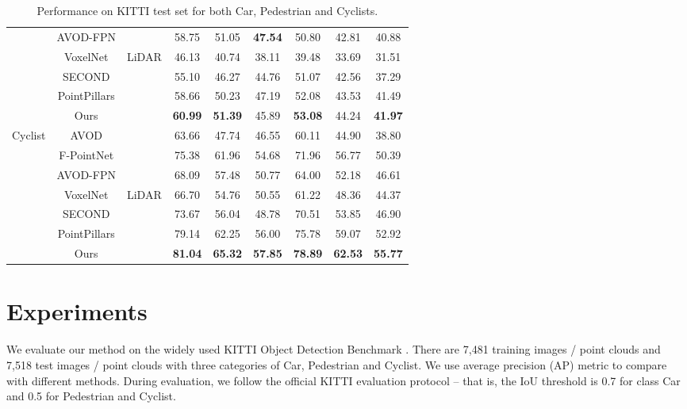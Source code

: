 \documentclass[10pt,twocolumn,letterpaper]{article}
\begin{document}
\begin{table*}[t]
\begin{tabular}{|c|c|c||c|c|c||c|c|c|}
      {} & AVOD-FPN \cite{AVOD} & {} & 58.75 & 51.05 & \bf 47.54 & 50.80 & 42.81 & 40.88 \\ \cline{2-9}
      {} & VoxelNet \cite{VOXELNET} & \multirow{5}{*}{LiDAR} & 46.13 & 40.74 & 38.11 & 39.48 & 33.69 & 31.51 \\
      {} & SECOND \cite{yan2018second} & {} & 55.10 & 46.27 & 44.76 & 51.07 & 42.56 & 37.29 \\
      {} & PointPillars \cite{lang2018pointpillars} & {} & 58.66 & 50.23 & 47.19 & 52.08 & 43.53 & 41.49 \\
      {} & Ours & {} & \bf 60.99 & \bf 51.39 & 45.89 & \bf 53.08 & 44.24 & \bf 41.97 \\
      \hline
      \hline
      \multirow {8}{*}{Cyclist} & AVOD \cite{AVOD}  & \multirow{3}{*}{RGB + LiDAR} & 63.66 & 47.74 & 46.55 & 60.11 & 44.90 & 38.80 \\
      {} & F-PointNet \cite{FPOINTNET} & {} & 75.38 & 61.96 & 54.68 & 71.96 & 56.77 & 50.39 \\ 
      {} & AVOD-FPN \cite{AVOD} & {} & 68.09 & 57.48 & 50.77 & 64.00 & 52.18 & 46.61 \\ \cline{2-9}
      {} & VoxelNet \cite{VOXELNET} & \multirow{5}{*}{LiDAR} & 66.70 & 54.76 & 50.55 & 61.22 & 48.36 & 44.37 \\
      {} & SECOND \cite{yan2018second} & {} & 73.67 & 56.04 & 48.78 & 70.51 & 53.85 & 46.90 \\
      {} & PointPillars \cite{lang2018pointpillars} & {} & 79.14 & 62.25 & 56.00 & 75.78 & 59.07 & 52.92 \\
      {} & Ours & {} & \bf 81.04 & \bf 65.32 & \bf 57.85 & \bf 78.89 & \bf 62.53 & \bf 55.77 \\
      \hline
   \end{tabular}\vspace{0.1cm}
   \caption{Performance on KITTI test set for both Car, Pedestrian and Cyclists.\vspace{-0.1in}}\label{tab:mainkitti}
\end{table*}


\section{Experiments}
We evaluate our method on the widely used KITTI Object Detection Benchmark \cite{KITTI3DBENCHMARK}. There are 7,481 training images / point clouds and 7,518 test images / point clouds with three categories of Car, Pedestrian and Cyclist. We use average precision (AP) metric to compare with different methods. During evaluation, we follow the official KITTI evaluation protocol -- that is, the IoU threshold is 0.7 for class Car and 0.5 for Pedestrian and Cyclist. 
\end{document}
